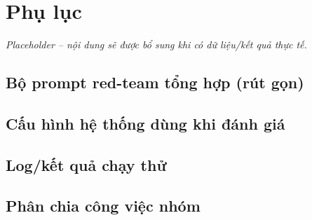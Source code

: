 \chapter{Phụ lục}
\label{ch:phu-luc}

\textit{Placeholder -- nội dung sẽ được bổ sung khi có dữ liệu/kết quả thực tế.}

\section{Bộ prompt red-team tổng hợp (rút gọn)}

\section{Cấu hình hệ thống dùng khi đánh giá}

\section{Log/kết quả chạy thử}

\section{Phân chia công việc nhóm}
